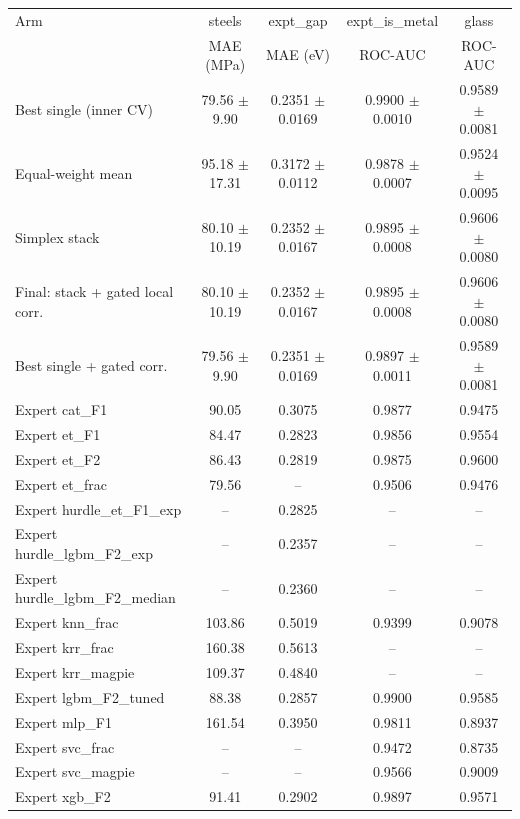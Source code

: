 \begin{tabular}{lcccc}
\toprule
Arm & steels & expt\_gap & expt\_is\_metal & glass \\
 & MAE (MPa) & MAE (eV) & ROC-AUC & ROC-AUC \\
\midrule
Best single (inner CV) & 79.56 $\pm$ 9.90 & 0.2351 $\pm$ 0.0169 & 0.9900 $\pm$ 0.0010 & 0.9589 $\pm$ 0.0081 \\
Equal-weight mean & 95.18 $\pm$ 17.31 & 0.3172 $\pm$ 0.0112 & 0.9878 $\pm$ 0.0007 & 0.9524 $\pm$ 0.0095 \\
Simplex stack & 80.10 $\pm$ 10.19 & 0.2352 $\pm$ 0.0167 & 0.9895 $\pm$ 0.0008 & 0.9606 $\pm$ 0.0080 \\
Final: stack + gated local corr. & 80.10 $\pm$ 10.19 & 0.2352 $\pm$ 0.0167 & 0.9895 $\pm$ 0.0008 & 0.9606 $\pm$ 0.0080 \\
Best single + gated corr. & 79.56 $\pm$ 9.90 & 0.2351 $\pm$ 0.0169 & 0.9897 $\pm$ 0.0011 & 0.9589 $\pm$ 0.0081 \\
\midrule
Expert cat\_F1 & 90.05 & 0.3075 & 0.9877 & 0.9475 \\
Expert et\_F1 & 84.47 & 0.2823 & 0.9856 & 0.9554 \\
Expert et\_F2 & 86.43 & 0.2819 & 0.9875 & 0.9600 \\
Expert et\_frac & 79.56 & -- & 0.9506 & 0.9476 \\
Expert hurdle\_et\_F1\_exp & -- & 0.2825 & -- & -- \\
Expert hurdle\_lgbm\_F2\_exp & -- & 0.2357 & -- & -- \\
Expert hurdle\_lgbm\_F2\_median & -- & 0.2360 & -- & -- \\
Expert knn\_frac & 103.86 & 0.5019 & 0.9399 & 0.9078 \\
Expert krr\_frac & 160.38 & 0.5613 & -- & -- \\
Expert krr\_magpie & 109.37 & 0.4840 & -- & -- \\
Expert lgbm\_F2\_tuned & 88.38 & 0.2857 & 0.9900 & 0.9585 \\
Expert mlp\_F1 & 161.54 & 0.3950 & 0.9811 & 0.8937 \\
Expert svc\_frac & -- & -- & 0.9472 & 0.8735 \\
Expert svc\_magpie & -- & -- & 0.9566 & 0.9009 \\
Expert xgb\_F2 & 91.41 & 0.2902 & 0.9897 & 0.9571 \\
\bottomrule
\end{tabular}
